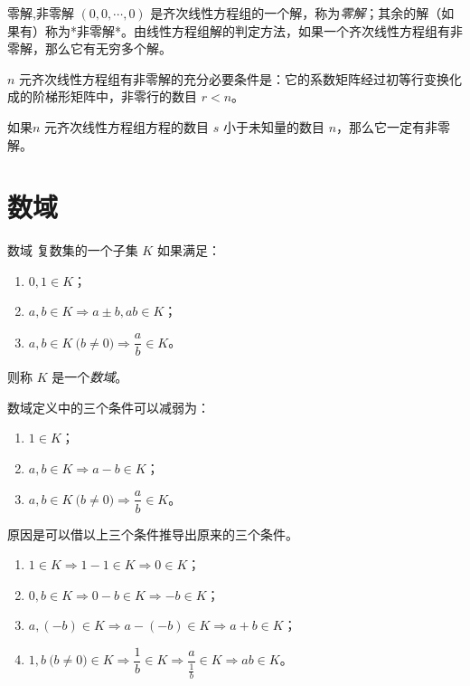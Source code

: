 \begin{definition}{零解,非零解}
	$(0, 0, \cdots, 0)$ 是齐次线性方程组的一个解，称为\emph{零解}；其余的解（如果有）称为*非零解*。由线性方程组解的判定方法，如果一个齐次线性方程组有非零解，那么它有无穷多个解。
\end{definition}

\begin{theorem}
	$n$ 元齐次线性方程组有非零解的充分必要条件是：它的系数矩阵经过初等行变换化成的阶梯形矩阵中，非零行的数目 $r < n$。
\end{theorem}

\begin{theorem}
	如果$n$ 元齐次线性方程组方程的数目 $s$ 小于未知量的数目 $n$，那么它一定有非零解。
\end{theorem}

\section{数域}

\begin{definition}{数域}
	复数集的一个子集 $K$ 如果满足：
	\begin{enumerate}
		\item $0, 1 \in K$；
		\item $a, b \in K \Longrightarrow a \pm b, ab \in K$；
		\item $a, b \in K \pod{b \ne 0} \Longrightarrow \dfrac{a}{b} \in K$。
	\end{enumerate}

	则称 $K$ 是一个\emph{数域}。
\end{definition}

数域定义中的三个条件可以减弱为：
\begin{enumerate}
	\item $1 \in K$；
	\item $a, b \in K \Longrightarrow a - b \in K$；
	\item $a, b \in K \pod{b \ne 0} \Longrightarrow \dfrac{a}{b} \in K$。
\end{enumerate}

原因是可以借以上三个条件推导出原来的三个条件。
\begin{enumerate}
	\item $1 \in K \Longrightarrow 1 - 1 \in K \Longrightarrow 0 \in K$；
	\item $0, b \in K \Longrightarrow 0 - b \in K \Longrightarrow -b \in K$；
	\item $a, (-b) \in K \Longrightarrow a - (-b) \in K \Longrightarrow a + b \in K$；
	\item $1, b \pod{b \ne 0} \in K \Longrightarrow \dfrac{1}{b} \in K \Longrightarrow \dfrac{a}{\frac{1}{b}} \in K \Longrightarrow ab \in K$。
\end{enumerate}

